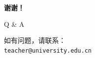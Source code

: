 \documentclass[aspectratio=43,12pt]{beamer}
\begin{document}
\begin{frame}
    \centering
    \Huge{\textbf{谢谢！}}
    
    \vspace{2em}
    \large{Q \& A}
    
    \vspace{1em}
    \normalsize
    如有问题，请联系：\\
    \texttt{teacher@university.edu.cn}
\end{frame}
\end{document}
